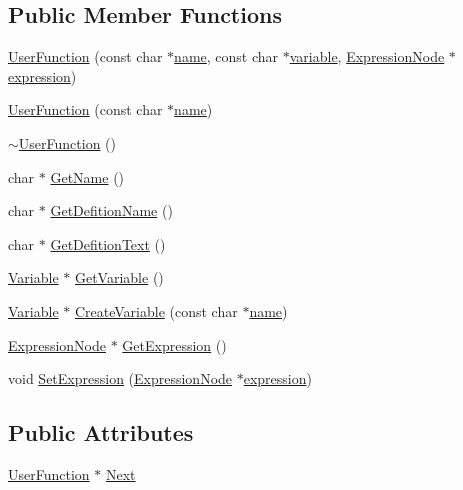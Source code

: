 \subsection*{Public Member Functions}
\begin{DoxyCompactItemize}
\item 
\hyperlink{classUserFunction_a2a97a3aea348cdf553fe73add0f6926e}{User\+Function} (const char $\ast$\hyperlink{classUserFunction_a7cb07de0ad054d5001875aa2b3ad639d}{name}, const char $\ast$\hyperlink{classUserFunction_a43e22a8c48e1d4770b0c4eadc3254aa8}{variable}, \hyperlink{classExpressionNode}{Expression\+Node} $\ast$\hyperlink{classUserFunction_ab7a0fb4f1265946883ef4e52dbe032f7}{expression})
\item 
\hyperlink{classUserFunction_a9e07b00bd2ff918fd11767cb627ad7df}{User\+Function} (const char $\ast$\hyperlink{classUserFunction_a7cb07de0ad054d5001875aa2b3ad639d}{name})
\item 
\hyperlink{classUserFunction_a5651163e734130aa94abd857481e582b}{$\sim$\+User\+Function} ()
\item 
char $\ast$ \hyperlink{classUserFunction_a59c59ebf5b45c5bb4aaa200a1218549d}{Get\+Name} ()
\item 
char $\ast$ \hyperlink{classUserFunction_ae75c29d08b4cb351b8d7e19a5e4045d0}{Get\+Defition\+Name} ()
\item 
char $\ast$ \hyperlink{classUserFunction_ae729fe8b29728831f6a7872931b4d2e7}{Get\+Defition\+Text} ()
\item 
\hyperlink{classVariable}{Variable} $\ast$ \hyperlink{classUserFunction_a4580afdaa5124951a523de07f3c454a6}{Get\+Variable} ()
\item 
\hyperlink{classVariable}{Variable} $\ast$ \hyperlink{classUserFunction_a9273684dd9351e945a10799ac6eb7038}{Create\+Variable} (const char $\ast$\hyperlink{classUserFunction_a7cb07de0ad054d5001875aa2b3ad639d}{name})
\item 
\hyperlink{classExpressionNode}{Expression\+Node} $\ast$ \hyperlink{classUserFunction_a41abe1afc9d481786b78ce7d7ffbde80}{Get\+Expression} ()
\item 
void \hyperlink{classUserFunction_ab033663735b65ce885eefd63e6208c24}{Set\+Expression} (\hyperlink{classExpressionNode}{Expression\+Node} $\ast$\hyperlink{classUserFunction_ab7a0fb4f1265946883ef4e52dbe032f7}{expression})
\end{DoxyCompactItemize}
\subsection*{Public Attributes}
\begin{DoxyCompactItemize}
\item 
\hyperlink{classUserFunction}{User\+Function} $\ast$ \hyperlink{classUserFunction_a5463f575d2ed50c0dbe069ec2841a5c9}{Next}
\end{DoxyCompactItemize}
